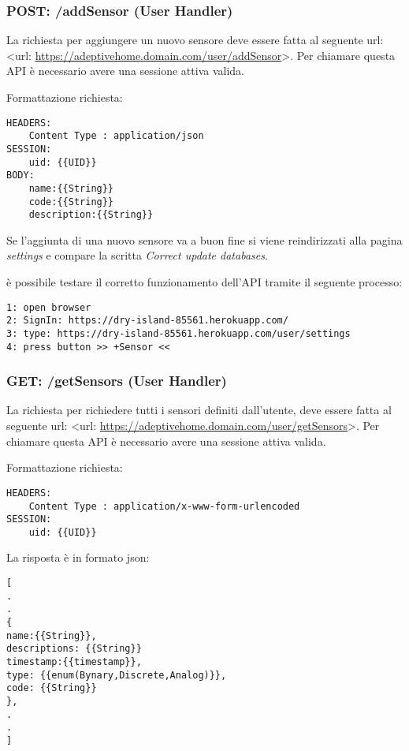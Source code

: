 \documentclass[onecolumn,a4paper]{article}
\begin{document}
\subsubsection{POST: /addSensor (User Handler)}
\label{sec:org3415ce0}
La richiesta per aggiungere un nuovo sensore deve essere fatta al seguente url: <url: \url{https://adeptivehome.domain.com/user/addSensor}>. Per chiamare questa API è necessario avere una sessione attiva valida. 

Formattazione richiesta:

\begin{verbatim}
HEADERS:
    Content Type : application/json
SESSION:
    uid: {{UID}}
BODY:
    name:{{String}}
    code:{{String}}
    description:{{String}}

\end{verbatim}

Se l'aggiunta di una nuovo sensore va a buon fine si viene reindirizzati alla pagina \emph{settings} e compare la scritta \emph{Correct update databases}.

è possibile testare il corretto funzionamento dell'API tramite il seguente processo:

\begin{verbatim}
1: open browser
2: SignIn: https://dry-island-85561.herokuapp.com/
3: type: https://dry-island-85561.herokuapp.com/user/settings
4: press button >> +Sensor <<  
\end{verbatim}

\subsubsection{GET: /getSensors (User Handler)}
\label{sec:org87819c5}
La richiesta per richiedere tutti i sensori definiti dall'utente, deve essere fatta al seguente url: <url: \url{https://adeptivehome.domain.com/user/getSensors}>. Per chiamare questa API è necessario avere una sessione attiva valida. 

Formattazione richiesta:

\begin{verbatim}
HEADERS:
    Content Type : application/x-www-form-urlencoded
SESSION:
    uid: {{UID}}

\end{verbatim}

La risposta è in formato json: 

\begin{verbatim}
[
.
.
{
name:{{String}},
descriptions: {{String}}
timestamp:{{timestamp}},
type: {{enum(Bynary,Discrete,Analog)}},
code: {{String}}
},
.
.
]
\end{verbatim}
\end{document}
